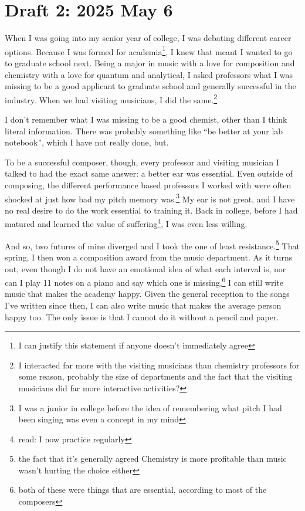 \documentclass[12pt]{article}
\newcommand{\say}[1]{``#1''}
\renewcommand{\,}{\textsuperscript{,}}
\begin{document}
\section{Draft 2: 2025 May 6}

When I was going into my senior year of college, I was debating different career options.  
Because I was formed for academia\footnote{I can justify this statement if anyone doesn't immediately agree}, I knew that meant I wanted to go to graduate school next.  
Being a major in music with a love for composition and chemistry with a love for quantum and analytical, I asked professors what I was missing to be a good applicant to graduate school and generally successful in the industry.  
When we had visiting musicians, I did the same.\footnote{I interacted far more with the visiting musicians than chemistry professors for some reason, probably the size of departments and the fact that the visiting musicians did far more interactive activities?}

I don't remember what I was missing to be a good chemist, other than I think literal information.  
There was probably something like \say{be better at your lab notebook}, which I have not really done, but.

To be a successful composer, though, every professor and visiting musician I talked to had the exact same answer: a better ear was essential.  
Even outside of composing, the different performance based professors I worked with were often shocked at just how bad my pitch memory was.\footnote{I was a junior in college before the idea of remembering what pitch I had been singing was even a concept in my mind}  
My ear is not great, and I have no real desire to do the work essential to training it.  
Back in college, before I had matured and learned the value of suffering\footnote{read: I now practice regularly}, I was even less willing.

And so, two futures of mine diverged and I took the one of least resistance.\footnote{the fact that it's generally agreed Chemistry is more profitable than music wasn't hurting the choice either}  
That spring, I then won a composition award from the music department.  
As it turns out, even though I do not have an emotional idea of what each interval is, nor can I play 11 notes on a piano and say which one is missing,\footnote{both of these were things that are essential, according to most of the composers} I can still write music that makes the academy happy.  
Given the general reception to the songs I've written since then, I can also write music that makes the average person happy too.  
The only issue is that I cannot do it without a pencil and paper.
\end{document}
